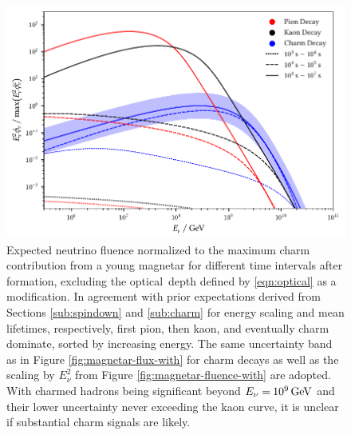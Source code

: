 \begin{figure}[H]
	\centering
	\includegraphics{../plots/build/magnetar_integrated_neutrino_spectrum_without.pdf}
	\caption[Magnetar $\nu \kern+0.5pt$ fluence compared to $c$ decay without optical depth.]
			{Expected neutrino fluence normalized to the maximum charm contribution from a young magnetar for different time
			 intervals after formation, excluding the optical~depth defined by \eqref{eqn:optical} as a modification.
			 In agreement with prior expectations derived from Sections \ref{sub:spindown} and \ref{sub:charm} for energy
			 scaling and mean lifetimes, respectively, first pion, then kaon, and eventually charm dominate, sorted
			 by increasing energy. The same uncertainty band as in Figure \ref{fig:magnetar-flux-with}
			 for charm decays as well as the scaling by $E_\nu^2$ from Figure \ref{fig:magnetar-fluence-with} are adopted.
			 With charmed hadrons being significant beyond $E_\nu = \kern-0.5pt \qty{e9}{\giga\electronvolt}$ and their lower
			 uncertainty never exceeding the kaon curve, it is unclear if substantial charm signals are likely.}
	\label{fig:magnetar-fluence-without}
\end{figure}
